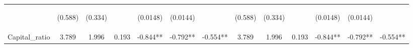 \documentclass[]{article}
\begin{document}
\begin{center}
\begin{tabular}{lcccccccccccc}
\vspace{4pt} & \begin{footnotesize}(0.588)\end{footnotesize} & \begin{footnotesize}(0.334)\end{footnotesize} & \begin{footnotesize}\end{footnotesize} & \begin{footnotesize}(0.0148)\end{footnotesize} & \begin{footnotesize}(0.0144)\end{footnotesize} & \begin{footnotesize}\end{footnotesize} & \begin{footnotesize}(0.588)\end{footnotesize} & \begin{footnotesize}(0.334)\end{footnotesize} & \begin{footnotesize}\end{footnotesize} & \begin{footnotesize}(0.0148)\end{footnotesize} & \begin{footnotesize}(0.0144)\end{footnotesize} & \begin{footnotesize}\end{footnotesize} \\
Capital\_ratio & 3.789 & 1.996 & 0.193 & -0.844** & -0.792** & -0.554** & 3.789 & 1.996 & 0.193 & -0.844** & -0.792** & -0.554** \\

\end{tabular}
\end{center}
\end{document}
